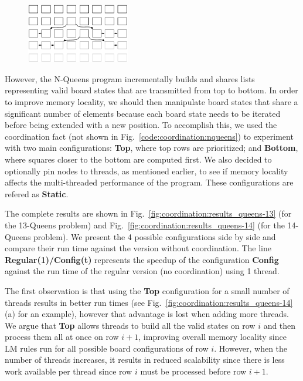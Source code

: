 \begin{figure}[ht!]
\includegraphics[width=0.4\textwidth]{figures/coordination/nqueens.pdf}
\label{coordination:fig:nqueens}
\end{figure}

However, the N-Queens program incrementally builds and shares lists representing
valid board states that are transmitted from top to bottom. In order to improve
memory locality, we should then manipulate board states that share a significant
number of elements because each board state needs to be iterated before being
extended with a new position. To accomplish this, we used the coordination fact
 (not shown in
Fig.~\ref{code:coordination:nqueens}) to experiment with two main
configurations: \textbf{Top}, where top rows are prioritized; and
\textbf{Bottom}, where squares closer to the bottom are computed first. We also
decided to optionally pin nodes to threads, as mentioned earlier, to see if
memory locality affects the multi-threaded performance of the program. These
configurations are refered as \textbf{Static}.

The complete results are shown in
Fig.~\ref{fig:coordination:results_queens-13} (for the 13-Queens problem) and
Fig.~\ref{fig:coordination:results_queens-14} (for the 14-Queens problem). We
present the 4 possible configurations side by side and compare their run time
against the version without coordination. The line \textbf{Regular(1)/Config(t)}
represents the speedup of the configuration \textbf{Config} against the run
time of the regular version (no coordination) using 1 thread.

The first observation is that using the \textbf{Top} configuration for a small
number of threads results in better run times (see
Fig.~\ref{fig:coordination:results_queens-14}(a) for an example), however that
advantage is lost when adding more threads. We argue that \textbf{Top} allows
threads to build all the valid states on row $i$ and then process them all at
once on row $i+1$, improving overall memory locality since LM rules run for all
possible board configurations of row $i$. However, when the number of threads
increases, it results in reduced scalability since there is less work available
per thread since row $i$ must be processed before row $i+1$.

